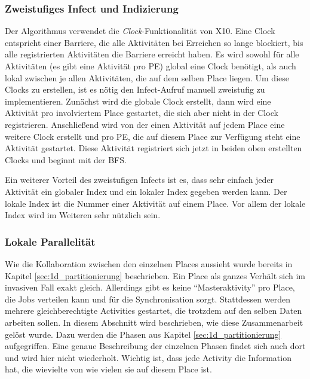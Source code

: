 \subsubsection{Zweistufiges Infect und Indizierung} %
\label{ssub:zweistufiges_infect}
Der Algorithmus verwendet die \textit{Clock}-Funktionalität von X10. Eine Clock entspricht einer Barriere, die alle Aktivitäten bei Erreichen so lange blockiert, bis alle registrierten Aktivitäten die Barriere erreicht haben. Es wird sowohl für alle Aktivitäten (es gibt eine Aktivität pro PE) global eine Clock benötigt, als auch lokal zwischen je allen Aktivitäten, die auf dem selben Place liegen. Um diese Clocks zu erstellen, ist es nötig den Infect-Aufruf manuell zweistufig zu implementieren. Zunächst wird die globale Clock erstellt, dann wird eine Aktivität pro involviertem Place gestartet, die sich aber nicht in der Clock registrieren. Anschließend wird von der einen Aktivität auf jedem Place eine weitere Clock erstellt und pro PE, die auf diesem Place zur Verfügung steht eine Aktivität gestartet. Diese Aktivität registriert sich jetzt in beiden oben erstellten Clocks und beginnt mit der BFS.

Ein weiterer Vorteil des zweistufigen Infects ist es, dass sehr einfach jeder Aktivität ein globaler Index und ein lokaler Index gegeben werden kann. Der lokale Index ist die Nummer einer Aktivität auf einem Place. Vor allem der lokale Index wird im Weiteren sehr nützlich sein.

\subsubsection{Lokale Parallelität} %
\label{ssub:lokale_parallelit_t}
Wie die Kollaboration zwischen den einzelnen Places aussieht wurde bereits in Kapitel \ref{sec:1d_partitionierung} beschrieben. Ein Place als ganzes Verhält sich im invasiven Fall exakt gleich. Allerdings gibt es keine \enquote{Masteraktivity} pro Place, die Jobs verteilen kann und für die Synchronisation sorgt. Stattdessen werden mehrere gleichberechtigte Activities gestartet, die trotzdem auf den selben Daten arbeiten sollen. In diesem Abschnitt wird beschrieben, wie diese Zusammenarbeit gelöst wurde. Dazu werden die Phasen aus Kapitel \ref{sec:1d_partitionierung} aufgegriffen. Eine genaue Beschreibung der einzelnen Phasen findet sich auch dort und wird hier nicht wiederholt. Wichtig ist, dass jede Activity die Information hat, die wievielte von wie vielen sie auf diesem Place ist.

